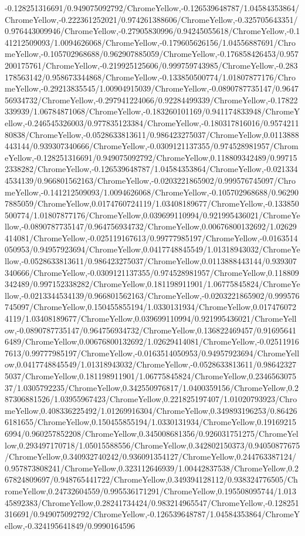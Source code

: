 {\begin{tikzternal}
{-0.128251316691/0.949075092792/ChromeYellow,-0.126539648787/1.04584353864/ChromeYellow,-0.222361252021/0.974261388606/ChromeYellow,-0.325705643351/0.976443009946/ChromeYellow,-0.27905830996/0.94245055618/ChromeYellow,-0.141212509093/1.0094626068/ChromeYellow,-0.179605626156/1.04556887691/ChromeYellow,-0.105702968688/0.962907885059/ChromeYellow,-0.176858426453/0.957200175761/ChromeYellow,-0.219925125606/0.999759743985/ChromeYellow,-0.283178563142/0.958673344868/ChromeYellow,-0.133850500774/1.01807877176/ChromeYellow,-0.29213835545/1.00904915039/ChromeYellow,-0.0890787735147/0.964756934732/ChromeYellow,-0.297941224066/0.92284499339/ChromeYellow,-0.17822339939/1.06784871068/ChromeYellow,-0.183260101169/0.941174833948/ChromeYellow,-0.246545326003/0.977835123384/ChromeYellow,-0.180317816016/0.957421180838/ChromeYellow,-0.0528633813611/0.986423275037/ChromeYellow,0.0113888443144/0.939307340666/ChromeYellow,-0.0309121137355/0.974528981957/ChromeYellow,-0.128251316691/0.949075092792/ChromeYellow,0.118809342489/0.997152338282/ChromeYellow,-0.126539648787/1.04584353864/ChromeYellow,-0.0213344534139/0.966801562163/ChromeYellow,-0.0203221865902/0.999576745097/ChromeYellow,-0.141212509093/1.0094626068/ChromeYellow,-0.105702968688/0.962907885059/ChromeYellow,0.0174760724119/1.03408189677/ChromeYellow,-0.133850500774/1.01807877176/ChromeYellow,0.039699110994/0.921995436021/ChromeYellow,-0.0890787735147/0.964756934732/ChromeYellow,0.00676800132692/1.02629414081/ChromeYellow,-0.025119167613/0.99777985197/ChromeYellow,-0.0163514050953/0.94957923694/ChromeYellow,0.0417748845549/1.01318943032/ChromeYellow,-0.0528633813611/0.986423275037/ChromeYellow,0.0113888443144/0.939307340666/ChromeYellow,-0.0309121137355/0.974528981957/ChromeYellow,0.118809342489/0.997152338282/ChromeYellow,0.181198911901/1.06775845824/ChromeYellow,-0.0213344534139/0.966801562163/ChromeYellow,-0.0203221865902/0.999576745097/ChromeYellow,0.150455855194/1.0330131934/ChromeYellow,0.0174760724119/1.03408189677/ChromeYellow,0.039699110994/0.921995436021/ChromeYellow,-0.0890787735147/0.964756934732/ChromeYellow,0.136822469457/0.916956416489/ChromeYellow,0.00676800132692/1.02629414081/ChromeYellow,-0.025119167613/0.99777985197/ChromeYellow,-0.0163514050953/0.94957923694/ChromeYellow,0.0417748845549/1.01318943032/ChromeYellow,-0.0528633813611/0.986423275037/ChromeYellow,0.181198911901/1.06775845824/ChromeYellow,0.234656307537/1.0305792235/ChromeYellow,0.342550976817/1.0400359156/ChromeYellow,0.287306881526/1.03955967423/ChromeYellow,0.221825197407/1.01020793923/ChromeYellow,0.408336225492/1.01269916304/ChromeYellow,0.349893196253/0.864266181655/ChromeYellow,0.150455855194/1.0330131934/ChromeYellow,0.191692156994/0.960257852208/ChromeYellow,0.345008681356/0.926031751275/ChromeYellow,0.293497170718/1.05015588556/ChromeYellow,0.342802150373/0.94050877675/ChromeYellow,0.340932740242/0.936091354127/ChromeYellow,0.244763387124/0.957873808241/ChromeYellow,0.323112646939/1.00442837538/ChromeYellow,0.267824809697/0.948765441722/ChromeYellow,0.349394128112/0.938324776505/ChromeYellow,0.24732604559/0.995536171291/ChromeYellow,0.195508095744/1.01345892383/ChromeYellow,0.28241734424/0.983214965547/ChromeYellow,-0.128251316691/0.949075092792/ChromeYellow,-0.126539648787/1.04584353864/ChromeYellow,-0.324195641849/0.9990164596}
\end{tikzternal}}
